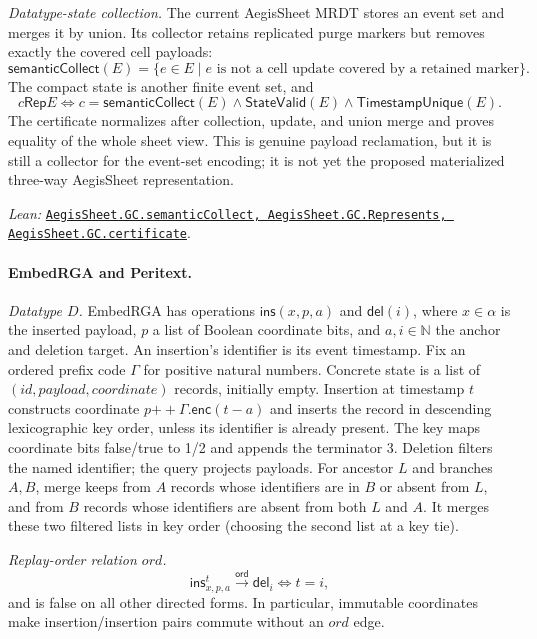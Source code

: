 \documentclass[11pt]{article}
\theoremstyle{definition}
\newcommand{\N}{\mathbb N}
\newcommand{\ord}{\mathrel{\xrightarrow{\mathsf{ord}}}}
\newcommand{\src}[2]{\href{../../#1}{\texttt{#2}}}
\newcommand{\anchor}[2]{\par\smallskip\noindent\emph{Lean: }\src{#1}{#2}.}
\begin{document}
\emph{Datatype-state collection.} The current AegisSheet MRDT stores an event set and merges it by union.  Its
collector retains replicated purge markers but removes exactly the covered
cell payloads:
\[
 \mathsf{semanticCollect}(E)
 =\{e\in E\mid e\text{ is not a cell update covered by a retained marker}\}.
\]
The compact state is another finite event set, and
\[
 c\mathrel{\mathsf{Rep}}E\Longleftrightarrow
 c=\mathsf{semanticCollect}(E)\land
 \mathsf{StateValid}(E)\land\mathsf{TimestampUnique}(E).
\]
The certificate normalizes after collection, update, and union merge and
proves equality of the whole sheet view.  This is genuine payload
reclamation, but it is still a collector for the event-set encoding; it is
not yet the proposed materialized three-way AegisSheet representation.
\anchor{Sal/MRDTs/Instances/AegisSheetGC.lean}
  {AegisSheet.GC.semanticCollect, AegisSheet.GC.Represents,
   AegisSheet.GC.certificate}

\paragraph{EmbedRGA and Peritext.}

\emph{Datatype $D$.} EmbedRGA has operations $\mathsf{ins}(x,p,a)$ and $\mathsf{del}(i)$, where
$x\in\alpha$ is the inserted payload, $p$ a list of Boolean coordinate bits,
and $a,i\in\N$ the anchor and deletion target. An insertion's identifier is
its event timestamp. Fix an ordered prefix code $\Gamma$
for positive natural numbers. Concrete state is a list of
$(\mathit{id},\mathit{payload},\mathit{coordinate})$ records, initially empty.
Insertion at timestamp $t$ constructs coordinate
$p{+\!+}\Gamma.\mathsf{enc}(t-a)$ and inserts the record in descending
lexicographic key order, unless its identifier is already present. The key
maps coordinate bits false/true to 1/2 and appends the terminator 3.
Deletion filters the named identifier; the query projects payloads.
For ancestor $L$ and branches $A,B$, merge keeps from $A$ records whose
identifiers are in $B$ or absent from $L$, and from $B$ records whose identifiers
are absent from both $L$ and $A$. It merges these two filtered lists in key
order (choosing the second list at a key tie).

\emph{Replay-order relation $ord$.}
\[
 \mathsf{ins}^{t}_{x,p,a}\ord\mathsf{del}_i
 \Longleftrightarrow t=i,
\]
and is false on all other directed forms. In particular, immutable
coordinates make insertion/insertion pairs commute without an $ord$ edge.
\end{document}

